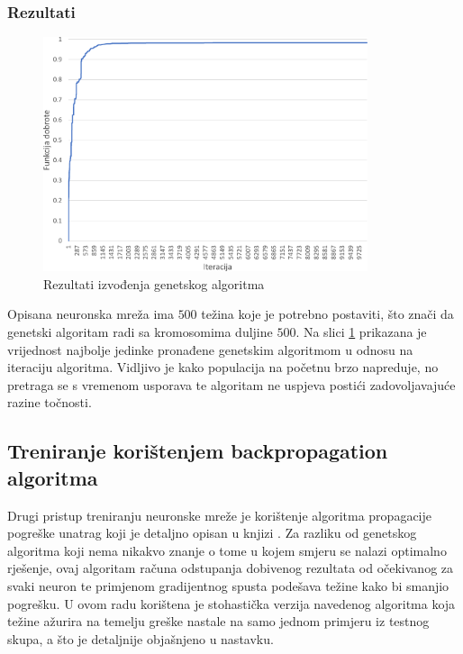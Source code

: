 \documentclass[times, utf8, zavrsni, numeric]{fer}
\begin{document}
\subsubsection{Rezultati}
\begin{figure}[ht!]
    \centering
    \includegraphics[width=0.85\textwidth]{Images/Ga.pdf}
    \captionsetup{justification=centering}
    \caption{Rezultati izvođenja genetskog algoritma}
    \label{fig:ga}
\end{figure}

Opisana neuronska mreža ima $500$ težina koje je potrebno postaviti, što znači da genetski algoritam radi sa kromosomima duljine $500$. 
Na slici \ref{fig:ga} prikazana je vrijednost najbolje jedinke pronađene genetskim algoritmom u odnosu na iteraciju algoritma.
Vidljivo je kako populacija na početnu brzo napreduje, no pretraga se s vremenom usporava te algoritam ne uspjeva postići zadovoljavajuće razine točnosti.

\subsection{Treniranje korištenjem backpropagation algoritma}
Drugi pristup treniranju neuronske mreže je korištenje algoritma propagacije pogreške unatrag koji je detaljno opisan u knjizi \cite{neuroracunarstvo}.
Za razliku od genetskog algoritma koji nema nikakvo znanje o tome u kojem smjeru se nalazi optimalno rješenje, ovaj algoritam računa odstupanja dobivenog rezultata od očekivanog za svaki neuron te primjenom gradijentnog spusta podešava težine kako bi smanjio pogrešku.
U ovom radu korištena je stohastička verzija navedenog algoritma koja težine ažurira na temelju greške nastale na samo jednom primjeru iz testnog skupa, a što je detaljnije objašnjeno u nastavku.
\end{document}
